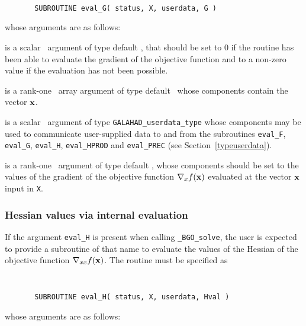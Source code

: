 \documentclass{galahad}
\newcommand{\packagename}{BGO}
\newcommand{\fullpackagename}{\libraryname\_\packagename}
\newcommand{\solver}{{\tt \fullpackagename\_solve}}
\begin{document}
\def\baselinestretch{0.8}
{\tt
\begin{verbatim}
       SUBROUTINE eval_G( status, X, userdata, G )
\end{verbatim} }
\def\baselinestretch{1.0}
\noindent whose arguments are as follows:

\begin{description}
 is a scalar \intentout\ argument of type default \integer,
that should be set to 0 if the routine has been able to evaluate
the gradient of the objective function
and to a non-zero value if the evaluation has not been possible.

 is a rank-one \intentin\ array argument of type default \realdp\
whose components contain the vector ${\mathbf{x}}$.

 is a scalar \intentinout\ argument of type
{\tt GALAHAD\_userdata\_type} whose components may be used
to communicate user-supplied data to and from the
subroutines {\tt eval\_F}, {\tt eval\_G},
{\tt eval\_H}, {\tt eval\_HPROD} and {\tt eval\_PREC}
(see Section~\ref{typeuserdata}).

 is a rank-one \intentout\ argument of type default \realdp,
whose components should be set to the values of the gradient
of the objective function $\nabla_x f({\mathbf{x}})$
evaluated at the vector ${\mathbf{x}}$ input in {\tt X}.

\end{description}


\subsubsection{Hessian values via internal evaluation\label{hfv}}

If the argument {\tt eval\_H} is present when calling \solver, the
user is expected to provide a subroutine of that name to evaluate the
values of the Hessian of the objective function $\nabla_{xx} f({\mathbf{x}})$.
The routine must be specified as

\def\baselinestretch{0.8}
{\tt
\begin{verbatim}
       SUBROUTINE eval_H( status, X, userdata, Hval )
\end{verbatim} }
\def\baselinestretch{1.0}
\noindent whose arguments are as follows:
\end{document}
